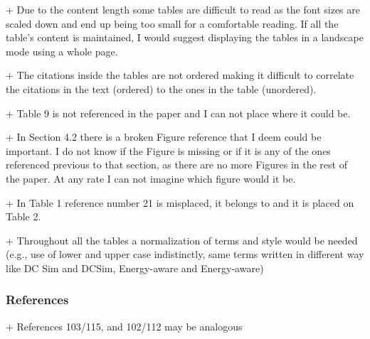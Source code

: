 


+ Due to the content length some tables are difficult to read as the font sizes are scaled down and end up being too small for a comfortable reading. If all the table's content is maintained, I would suggest displaying the tables in a landscape mode using a whole page.


+ The citations inside the tables are not ordered making it difficult to correlate the citations in the text (ordered) to the ones in the table (unordered).


+ Table 9 is not referenced in the paper and I can not place where it could be.


+ In Section 4.2 there is a broken Figure reference that I deem could be important. I do not know if the Figure is missing or if it is any of the ones referenced previous to that section, as there are no more Figures in the rest of the paper. At any rate I can not imagine which figure would it be.


+ In Table 1 reference number 21 is misplaced, it belongs to and it is
placed on Table 2.


+ Throughout all the tables a normalization of terms and style would be needed (e.g., use of lower and upper case indistinctly, same terms written in different way like DC Sim and DCSim, Energy-aware and Energy-aware)




\subsubsection{References}

+ References 103/115, and 102/112 may be analogous

